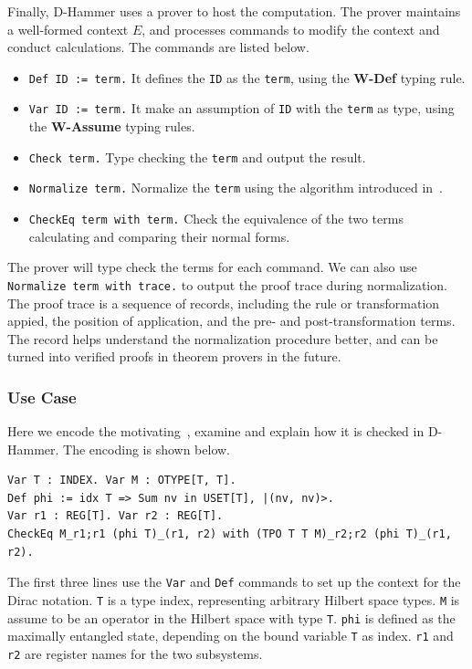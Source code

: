 Finally, D-Hammer uses a prover to host the computation. The prover maintains a well-formed context $E$, and processes commands to modify the context and conduct calculations. The commands are listed below.
\begin{itemize}
    \item \texttt{\textcolor{NavyBlue}{Def} ID := term.} It defines the \texttt{ID} as the \texttt{term}, using the \textbf{W-Def} typing rule.
    \item \texttt{\textcolor{NavyBlue}{Var} ID := term.} It make an assumption of \texttt{ID} with the \texttt{term} as type, using the \textbf{W-Assume} typing rules.
    \item \texttt{\textcolor{NavyBlue}{Check} term.} Type checking the \texttt{term} and output the result.
    \item \texttt{\textcolor{NavyBlue}{Normalize} term.} Normalize the \texttt{term} using the algorithm introduced in~.
    \item \texttt{\textcolor{NavyBlue}{CheckEq} term \textcolor{NavyBlue}{with} term.} Check the equivalence of the two terms calculating and comparing their normal forms.
\end{itemize}
The prover will type check the terms for each command. We can also use \texttt{\textcolor{NavyBlue}{Normalize} term \textcolor{NavyBlue}{with trace}.} to output the proof trace during normalization. The proof trace is a sequence of records, including the rule or transformation appied, the position of application, and the pre- and post-transformation terms. The record helps understand the normalization procedure better, and can be turned into verified proofs in theorem provers in the future.



\subsubsection{Use Case}
Here we encode the motivating~, examine and explain how it is checked in D-Hammer. The encoding is shown below.

    \begin{lstlisting}[style=dhammer]
Var T : INDEX. Var M : OTYPE[T, T].
Def phi := idx T => Sum nv in USET[T], |(nv, nv)>.
Var r1 : REG[T]. Var r2 : REG[T].
CheckEq M_r1;r1 (phi T)_(r1, r2) with (TPO T T M)_r2;r2 (phi T)_(r1, r2).
    \end{lstlisting}        

The first three lines use the \texttt{\textcolor{NavyBlue}{Var}} and \texttt{\textcolor{NavyBlue}{Def}} commands to set up the context for the Dirac notation.
\texttt{T} is a type index, representing arbitrary Hilbert space types. \texttt{M} is assume to be an operator in the Hilbert space with type \texttt{T}. \texttt{phi} is defined as the maximally entangled state, depending on the bound variable \texttt{T} as index.
\texttt{r1} and \texttt{r2} are register names for the two subsystems.

